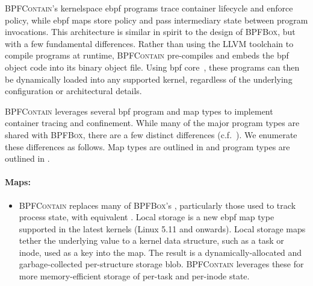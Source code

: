 \documentclass[
  fontsize=12pt,
  titlepage=firstiscover,
  paper=letter,
oneside,
  cleardoublepage=plain,
  parskip=half-,
  DIV=10,
  parindent,
  appendixprefix,
  chapterprefix,
  listof=totoc,
]{scrbook}
\newcommand{\bpfbox}{\textsc{BPFBox}}
\newcommand{\bpfcontain}{\textsc{BPFContain}}
\begin{document}
\bpfcontain{}'s kernelspace \gls{ebpf} programs trace container lifecycle and enforce
policy, while \gls{ebpf} maps store policy and pass intermediary state between program
invocations. This architecture is similar in spirit to the design of \bpfbox{}, but with
a few fundamental differences. Rather than using the LLVM toolchain to compile
programs at runtime, \bpfcontain{} pre-compiles and embeds the \gls{bpf} object code into
its binary object file. Using \gls{bpf} \gls{core}~\cite{nakryiko2020_core}, these
programs can then be dynamically loaded into any supported kernel, regardless of the
underlying configuration or architectural details.

\bpfcontain{} leverages several \gls{bpf} program and map types to implement container
tracing and confinement. While many of the major program types are shared with \bpfbox{},
there are a few distinct differences (c.f.\ ). We enumerate
these differences as follows. Map types are outlined in \textbf{} and program
types are outlined in \textbf{}.

\paragraph*{Maps:}
\begin{itemize}
  \item \bpfcontain{} replaces many of \bpfbox{}'s \textbf{},
  particularly those used to track process state, with equivalent \textbf{}. Local storage is a new \gls{ebpf} map type supported in the latest
  kernels (Linux 5.11 and onwards). Local storage maps tether the underlying value to
  a kernel data structure, such as a task or inode, used as a key into the map. The result
  is a dynamically-allocated and garbage-collected per-structure storage blob.
  \bpfcontain{} leverages these for more memory-efficient storage of per-task and
  per-inode state.
\end{itemize}
\end{document}
